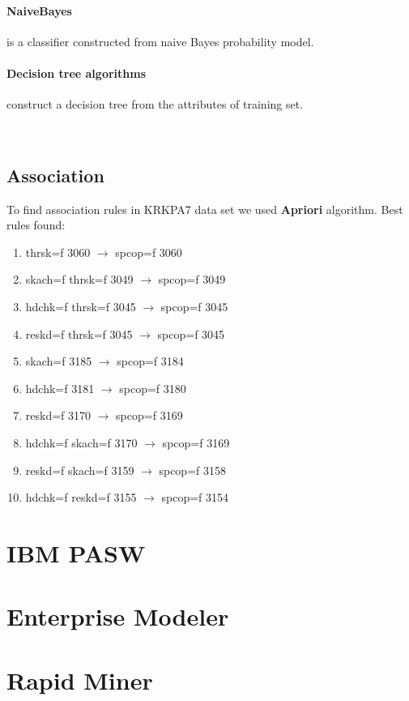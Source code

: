 \documentclass[11pt]{article}
\begin{document}
\paragraph{NaiveBayes} is a classifier constructed from naive Bayes probability model.
\paragraph{Decision tree algorithms} construct a decision tree from the attributes of training set.

\mbox{}\\
\begin{table}[h]
\caption{WEKA Classifiers}
\label{tab:attributes}
\end{table}

\subsection{Association}
To find association rules in KRKPA7 data set we used {\bf Apriori} algorithm.
Best rules found:

\begin{enumerate}
\item thrsk=f 3060 $\rightarrow$ spcop=f 3060
\item skach=f thrsk=f 3049 $\rightarrow$ spcop=f 3049
\item hdchk=f thrsk=f 3045 $\rightarrow$ spcop=f 3045
\item reskd=f thrsk=f 3045 $\rightarrow$ spcop=f 3045
\item skach=f 3185 $\rightarrow$ spcop=f 3184
\item hdchk=f 3181 $\rightarrow$ spcop=f 3180
\item reskd=f 3170 $\rightarrow$ spcop=f 3169
\item hdchk=f skach=f 3170 $\rightarrow$ spcop=f 3169
\item reskd=f skach=f 3159 $\rightarrow$ spcop=f 3158
\item hdchk=f reskd=f 3155 $\rightarrow$ spcop=f 3154
\end{enumerate}




\section{IBM PASW}
\section{Enterprise Modeler}
\section{Rapid Miner}



\clearpage


\end{document}
